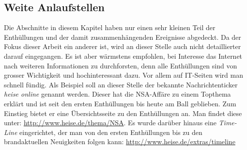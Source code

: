 \subsection{Weite Anlaufstellen}
Die Abschnitte in diesem Kapitel haben nur einen sehr kleinen Teil der Enthüllungen und der damit zusammenhängenden Ereignisse abgedeckt. Da der Fokus dieser Arbeit ein anderer ist, wird an dieser Stelle auch nicht detaillierter darauf eingegangen. Es ist aber wärmstens empfohlen, bei Interesse das Internet nach weiteren Informationen zu durchforsten, denn alle Enthüllungen sind von grosser Wichtigkeit und hochinteressant dazu. Vor allem auf IT-Seiten wird man schnell fündig. Als Beispiel soll an dieser Stelle der bekannte Nachrichtenticker \textit{heise online} genannt werden. Dieser hat die NSA-Affäre zu einem Topthema erklärt und ist seit den ersten Enthüllungen bis heute am Ball geblieben. Zum Einstieg bietet er eine Übersichtsseite zu den Enthüllungen an. Man findet diese unter: \url{http://www.heise.de/thema/NSA}. Es wurde darüber hinaus eine \textit{Time-Line} eingerichtet, der man von den ersten Enthüllungen bis zu den brandaktuellen Neuigkeiten folgen kann: \url{http://www.heise.de/extras/timeline}
